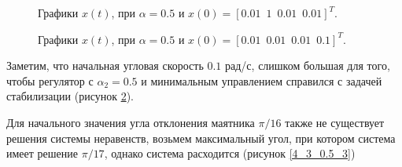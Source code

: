 \begin{figure}[!h]
\caption{Графики $x(t)$, при $\alpha = 0.5$ и $x(0) = [0.01\, \, \,  1\, \, \, 0.01\, \, \, 0.01]^T$.}
\label{4_3_0.5_1}
\end{figure}


\begin{figure}[!h]
\caption{Графики $x(t)$, при $\alpha = 0.5$ и $x(0) = [0.01\, \, \,  0.01\, \, \, 0.01\, \, \, 0.1]^T$.}
\label{4_3_0.5_2}
\end{figure}

Заметим, что начальная угловая скорость $0.1$ рад/с, слишком большая для того, чтобы регулятор с $\alpha_2 = 0.5$ и минимальным управлением справился с задачей стабилизации (рисунок \ref{4_3_0.5_2}).

Для начального значения угла отклонения маятника $\pi /16$ также не существует решения системы неравенств, возьмем максимальный угол, при котором система имеет решение $\pi /17$, однако система расходится (рисунок \ref{4_3_0.5_3})

